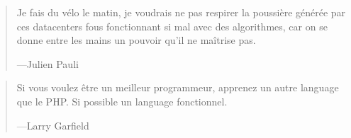 \begin{frame}
    \begin{quote}
        Je fais du vélo le matin, je voudrais ne pas respirer la poussière générée
        par ces datacenters fous fonctionnant si mal avec des algorithmes,
        car on se donne entre les mains un pouvoir qu'il ne maîtrise pas.

        \begin{flushright}
            \tiny{---Julien Pauli}
        \end{flushright}
    \end{quote}
\end{frame}

\begin{frame}
    \begin{quote}
        Si vous voulez être un meilleur programmeur, apprenez un autre language que
        le PHP. Si possible un language fonctionnel.

        \begin{flushright}
            \tiny{---Larry Garfield}
        \end{flushright}
    \end{quote}
\end{frame}





